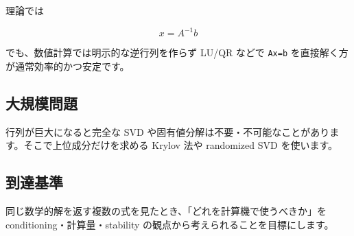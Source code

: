 \documentclass[
  11pt,
  a4paper,
]{ltjsarticle}
\begin{document}
理論では

\[
x=A^{-1}b
\]

でも、数値計算では明示的な逆行列を作らず LU/QR などで \texttt{Ax=b}
を直接解く方が通常効率的かつ安定です。

\hypertarget{ux5927ux898fux6a21ux554fux984c}{%
\subsection{大規模問題}\label{ux5927ux898fux6a21ux554fux984c}}

行列が巨大になると完全な SVD
や固有値分解は不要・不可能なことがあります。そこで上位成分だけを求める
Krylov 法や randomized SVD を使います。

\hypertarget{ux5230ux9054ux57faux6e96}{%
\subsection{到達基準}\label{ux5230ux9054ux57faux6e96}}

同じ数学的解を返す複数の式を見たとき、「どれを計算機で使うべきか」を
conditioning・計算量・stability の観点から考えられることを目標にします。
\end{document}

